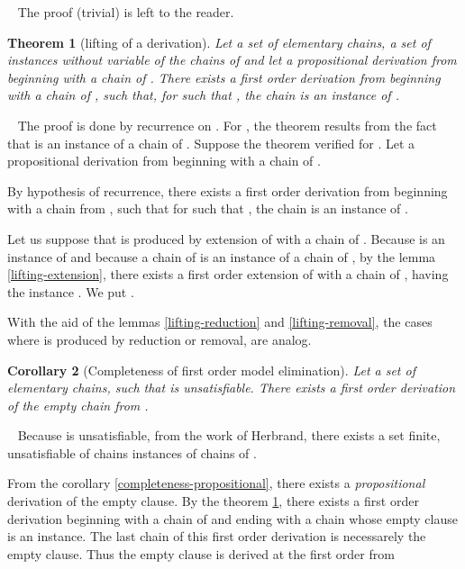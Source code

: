 \documentclass{article}
\newtheorem{theoreme}{Theorem}\newtheorem{lemme}[theoreme]{Lemma}
\newtheorem{corollaire}[theoreme]{Corollary}
\newenvironment{preuve}{\noindent {\em Proof :}\ }{{\hfill
    }\vspace{.5pc}} \newcommand{\sg}{\!\!<\!\!}
\begin{document}
\begin{preuve}
The proof (trivial) is left to the reader.
\end{preuve}

\begin{theoreme}[lifting of a derivation]\label{lifting-derivation}
Let  a set of elementary chains,  a set of instances without variable of the chains of  and
let  a propositional derivation from  beginning with a chain of .
There exists a first order derivation  from  beginning with a chain of , such that,
for  such that , the chain  is an instance of .
\end{theoreme}

\begin{preuve}
The proof is done by recurrence on .
For , the theorem results from the fact that  is an instance of a chain of . 
Suppose the theorem verified for . Let  a propositional derivation from 
beginning with a chain of .

By hypothesis of recurrence, there exists a first order derivation  from  beginning with a chain from 
, such that for  such that , the chain  is an instance of .

Let us suppose that  is produced by extension of  with a chain of . Because  is an instance of  and
because a chain of  is an instance of a chain of , by the lemma \ref{lifting-extension}, there exists  a 
first order extension of  with a chain of , having the instance . We put .

With the aid of the lemmas \ref{lifting-reduction} and \ref{lifting-removal}, the cases where  is produced by reduction
or removal, are analog.
\end{preuve}


\begin{corollaire}[Completeness of first order model elimination]
Let  a set of elementary chains, such that  is unsatisfiable. There exists a first order derivation
of the empty chain from .
\end{corollaire}

\begin{preuve}
Because  is unsatisfiable, from the work of Herbrand, there exists a set  finite, unsatisfiable of
chains instances of chains of .

From the corollary \ref{completeness-propositional}, there exists a \emph{propositional} derivation of the empty clause.
By the theorem \ref{lifting-derivation}, there exists a first order derivation beginning with a chain of 
and ending with a chain whose empty clause is an instance. The last chain of this first order derivation is necessarely the
empty clause. Thus the empty clause is derived at the first order from 
\end{preuve}
\end{document}
